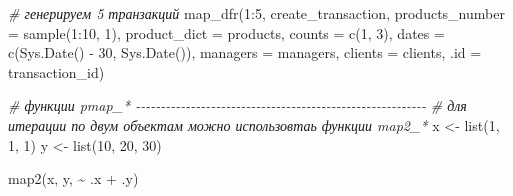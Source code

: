 \documentclass[
]{book}
\newenvironment{Shaded}{\begin{snugshade}}{\end{snugshade}}
\newcommand{\AttributeTok}[1]{\textcolor[rgb]{0.77,0.63,0.00}{#1}}
\newcommand{\CommentTok}[1]{\textcolor[rgb]{0.56,0.35,0.01}{\textit{#1}}}
\newcommand{\DecValTok}[1]{\textcolor[rgb]{0.00,0.00,0.81}{#1}}
\newcommand{\FunctionTok}[1]{\textcolor[rgb]{0.00,0.00,0.00}{#1}}
\newcommand{\NormalTok}[1]{#1}
\newcommand{\OtherTok}[1]{\textcolor[rgb]{0.56,0.35,0.01}{#1}}
\newcommand{\SpecialCharTok}[1]{\textcolor[rgb]{0.00,0.00,0.00}{#1}}
\newcommand{\StringTok}[1]{\textcolor[rgb]{0.31,0.60,0.02}{#1}}
\begin{document}
\begin{Shaded}
\begin{Highlighting}[]
\CommentTok{\# генерируем 5 транзакций}
\FunctionTok{map\_dfr}\NormalTok{(}\DecValTok{1}\SpecialCharTok{:}\DecValTok{5}\NormalTok{,}
\NormalTok{        create\_transaction,}
            \AttributeTok{products\_number =} \FunctionTok{sample}\NormalTok{(}\DecValTok{1}\SpecialCharTok{:}\DecValTok{10}\NormalTok{, }\DecValTok{1}\NormalTok{),}
            \AttributeTok{product\_dict =}\NormalTok{ products,}
            \AttributeTok{counts =} \FunctionTok{c}\NormalTok{(}\DecValTok{1}\NormalTok{, }\DecValTok{3}\NormalTok{),}
            \AttributeTok{dates =} \FunctionTok{c}\NormalTok{(}\FunctionTok{Sys.Date}\NormalTok{() }\SpecialCharTok{{-}} \DecValTok{30}\NormalTok{, }\FunctionTok{Sys.Date}\NormalTok{()),}
            \AttributeTok{managers =}\NormalTok{ managers,}
            \AttributeTok{clients =}\NormalTok{ clients,}
        \AttributeTok{.id =} \StringTok{\textquotesingle{}transaction\_id\textquotesingle{}}\NormalTok{)}

\CommentTok{\# функции pmap\_* {-}{-}{-}{-}{-}{-}{-}{-}{-}{-}{-}{-}{-}{-}{-}{-}{-}{-}{-}{-}{-}{-}{-}{-}{-}{-}{-}{-}{-}{-}{-}{-}{-}{-}{-}{-}{-}{-}{-}{-}{-}{-}{-}{-}{-}{-}{-}{-}{-}{-}{-}{-}{-}{-}{-}{-}{-}{-}}
\CommentTok{\# для итерации по двум объектам можно использовтаь функции map2\_*}
\NormalTok{x }\OtherTok{\textless{}{-}} \FunctionTok{list}\NormalTok{(}\DecValTok{1}\NormalTok{, }\DecValTok{1}\NormalTok{, }\DecValTok{1}\NormalTok{)}
\NormalTok{y }\OtherTok{\textless{}{-}} \FunctionTok{list}\NormalTok{(}\DecValTok{10}\NormalTok{, }\DecValTok{20}\NormalTok{, }\DecValTok{30}\NormalTok{)}

\FunctionTok{map2}\NormalTok{(x, y, }\SpecialCharTok{\textasciitilde{}}\NormalTok{ .x }\SpecialCharTok{+}\NormalTok{ .y)}


\end{Highlighting}
\end{Shaded}
\end{document}
